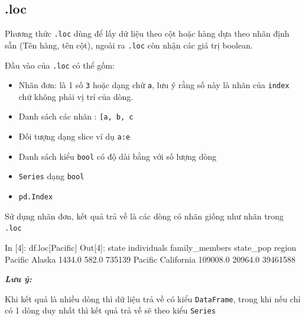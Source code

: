 \documentclass[
]{book}
\makeatletter
\newenvironment{Shaded}{\begin{snugshade}}{\end{snugshade}}
\newcommand{\DecValTok}[1]{\textcolor[rgb]{0.00,0.00,0.81}{#1}}
\newcommand{\FloatTok}[1]{\textcolor[rgb]{0.00,0.00,0.81}{#1}}
\newcommand{\NormalTok}[1]{#1}
\newcommand{\StringTok}[1]{\textcolor[rgb]{0.31,0.60,0.02}{#1}}
\newenvironment{kframe}{%
\medskip{}
\setlength{\fboxsep}{.8em}
 \def\at@end@of@kframe{}%
 \ifinner\ifhmode%
  \def\at@end@of@kframe{\end{minipage}}%
  \begin{minipage}{\columnwidth}%
 \fi\fi%
 \def\FrameCommand##1{\hskip\@totalleftmargin \hskip-\fboxsep
 \colorbox{shadecolor}{##1}\hskip-\fboxsep
     \hskip-\linewidth \hskip-\@totalleftmargin \hskip\columnwidth}%
 \MakeFramed {\advance\hsize-\width
   \@totalleftmargin\z@ \linewidth\hsize
   \@setminipage}}%
 {\par\unskip\endMakeFramed%
 \at@end@of@kframe}
\newenvironment{rmdblock}[1]
  {
  \begin{itemize}
  \renewcommand{\labelitemi}{
    \raisebox{-.7\height}[0pt][0pt]{
      {\setkeys{Gin}{width=3em,keepaspectratio}\texttt{[image: images/\#1]}}
    }
  }
  \setlength{\fboxsep}{1em}
  \begin{kframe}
  \item
  }
  {
  \end{kframe}
  \end{itemize}
  }
\newenvironment{rmdnote}
  {\begin{rmdblock}{note}}
  {\end{rmdblock}}
\makeatother
\begin{document}
\hypertarget{loc}{%
\subsection{.loc}\label{loc}}

Phương thức \texttt{.loc} dùng để lấy dữ liệu theo cột hoặc hàng dựa theo nhãn định sẵn (Tên hàng, tên cột), ngoài ra \texttt{.loc} còn nhận các giá trị boolean.

Đầu vào của \texttt{.loc} có thể gồm:

\begin{itemize}
\item
  Nhãn đơn: là 1 số \texttt{3} hoặc dạng chữ \texttt{a}, lưu ý rằng số này là nhãn của \texttt{index} chứ không phải vị trí của dòng.
\item
  Danh sách các nhãn : \texttt{{[}\textquotesingle{}a\textquotesingle{},\ \textquotesingle{}b\textquotesingle{},\ \textquotesingle{}c\textquotesingle{}{]}}
\item
  Đối tượng dạng slice ví dụ \texttt{\textquotesingle{}a\textquotesingle{}:\textquotesingle{}e\textquotesingle{}}
\item
  Danh sách kiểu \texttt{bool} có độ dài bằng với số lượng dòng
\item
  \texttt{Series} dạng \texttt{bool}
\item
  \texttt{pd.Index}
\end{itemize}

Sử dụng nhãn đơn, kết quả trả về là các dòng có nhãn giống như nhãn trong \texttt{.loc}

\begin{Shaded}
\begin{Highlighting}[]
\NormalTok{In [}\DecValTok{4}\NormalTok{]: df.loc[}\StringTok{\textquotesingle{}Pacific\textquotesingle{}}\NormalTok{]}
\NormalTok{Out[}\DecValTok{4}\NormalTok{]:          }
\NormalTok{              state  individuals  family\_members  state\_pop}
\NormalTok{region                                                     }
\NormalTok{Pacific      Alaska       }\FloatTok{1434.0}           \FloatTok{582.0}     \DecValTok{735139}
\NormalTok{Pacific  California     }\FloatTok{109008.0}         \FloatTok{20964.0}   \DecValTok{39461588}
\end{Highlighting}
\end{Shaded}

\begin{rmdnote}
\textbf{\emph{Lưu ý:}}

Khi kết quả là nhiều dòng thì dữ liệu trả về có kiểu \texttt{DataFrame}, trong khi nếu chỉ có 1 dòng duy nhất thì kết quả trả về sẽ theo kiểu \texttt{Series}
\end{rmdnote}
\end{document}
